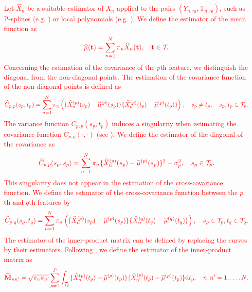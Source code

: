 \textcolor{red}{Let $\widehat{X}_n$ be a suitable estimator of $X_n$ applied to the pairs $(Y_{n, \mathsf{m}}, \mathrm{T}_{n, \mathsf{m}})$, such as P-splines (e.g. \cite{eilersTwentyYearsPsplines2015}) or local polynomials (e.g. \cite{fanLocalPolynomialModelling1996}). We define the estimator of the mean function as}
\begin{equation}
    \textcolor{red}{\widehat{\mu}(\mathbf{t}) = \sum_{n = 1}^N \pi_n \widehat{X}_n(\mathbf{t}), \quad \mathbf{t} \in \mathcal{T}_{}.}
\end{equation}
\textcolor{red}{Concerning the estimation of the covariance of the $p$th feature, we distinguish the diagonal from the non-diagonal points. The estimation of the covariance function of the non-diagonal points is defined as}
\begin{equation}
    \textcolor{red}{\widehat{C}_{p, p}(s_p, t_p) = \sum_{n = 1}^N \pi_n\left(\{\widehat{X}_n^{(p)}(s_p) - \widehat{\mu}^{(p)}(s_p)\}\{\widehat{X}_n^{(p)}(t_p) - \widehat{\mu}^{(p)}(t_p)\}\right), \quad s_p \neq t_p, \quad s_p, t_p \in \mathcal{T}_{p}.}
\end{equation}
\textcolor{red}{The variance function $C_{p, p}(s_p, t_p)$ induces a singularity when estimating the covariance function $C_{p, p}(\cdot, \cdot)$ (see \cite{yaoFunctionalDataAnalysis2005,zhangSparseDenseFunctional2016}). We define the estimator of the diagonal of the covariance as}
\begin{equation}
    \textcolor{red}{\widehat{C}_{p, p}(s_p, s_p) = \sum_{n = 1}^N \pi_n\{\widehat{X}_n^{(p)}(s_p) - \widehat{\mu}^{(p)}(s_p)\}^2 - \sigma_p^2, \quad s_p \in \mathcal{T}_{p}.}
\end{equation}
\textcolor{red}{This singularity does not appear in the estimation of the cross-covariance function. We define the estimator of the cross-covariance function between the $p$th and $q$th features by}
\begin{equation}
    \textcolor{red}{\widehat{C}_{p, q}(s_p, t_q) = \sum_{n = 1}^N \pi_n\left(\{\widehat{X}_n^{(p)}(s_p) - \widehat{\mu}^{(p)}(s_p)\}\{\widehat{X}_n^{(q)}(t_q) - \widehat{\mu}^{(q)}(t_q)\}\right), \quad s_p \in \mathcal{T}_{p}, t_q \in \mathcal{T}_{q}.}
\end{equation}
\textcolor{red}{The estimator of the inner-product matrix can be defined by replacing the curves by their estimators. Following \cite{benkoCommonFunctionalPrincipal2009,grithFunctionalPrincipalComponent2018}, we define the estimator of the inner-product matrix as}
\begin{equation}
    \textcolor{red}{\widehat{\mathbf{M}}_{nn^\prime} = \sqrt{\pi_n \pi_{n^{\prime}}}\sum_{p = 1}^P \int_{\mathcal{T}_{p}}\{\widehat{X}_n^{(p)}(t_p) - \widehat{\mu}^{(p)}(t_p)\}\{\widehat{X}^{(p)}_{n^\prime}(t_p) - \widehat{\mu}^{(p)}(t_p)\} {\rm d} t_p, \quad n, n^\prime = 1, \dots, N.}
\end{equation}
